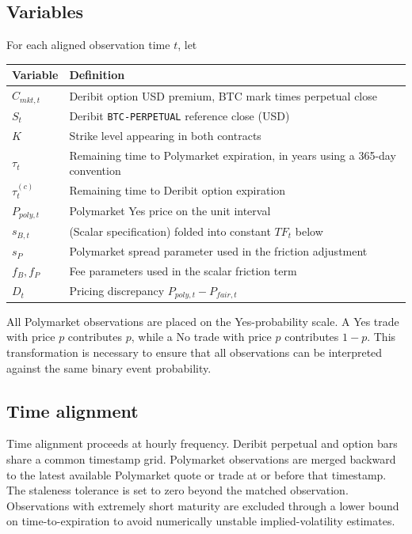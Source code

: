 \documentclass[11pt]{article}
\numberwithin{equation}{section}
\theoremstyle{plain}
\begin{document}
\subsection{Variables}
For each aligned observation time $t$, let
\begin{center}
\begin{tabular}{ll}
\toprule
Variable & Definition \\
\midrule
$C_{mkt,t}$ & Deribit option USD premium, BTC mark times perpetual close \\
$S_t$ & Deribit \texttt{BTC-PERPETUAL} reference close (USD) \\
$K$ & Strike level appearing in both contracts \\
$\tau_t$ & Remaining time to Polymarket expiration, in years using a 365-day convention \\
$\tau_t^{(c)}$ & Remaining time to Deribit option expiration \\
$P_{poly,t}$ & Polymarket Yes price on the unit interval \\
$s_{B,t}$ & (Scalar specification) folded into constant $TF_t$ below \\
$s_P$ & Polymarket spread parameter used in the friction adjustment \\
$f_B,f_P$ & Fee parameters used in the scalar friction term \\
$D_t$ & Pricing discrepancy $P_{poly,t}-P_{fair,t}$ \\
\bottomrule
\end{tabular}
\end{center}

All Polymarket observations are placed on the Yes-probability scale. A Yes trade with price $p$ contributes $p$, while a No trade with price $p$ contributes $1-p$. This transformation is necessary to ensure that all observations can be interpreted against the same binary event probability.

\subsection{Time alignment}
Time alignment proceeds at hourly frequency. Deribit perpetual and option bars share a common timestamp grid. Polymarket observations are merged backward to the latest available Polymarket quote or trade at or before that timestamp. The staleness tolerance is set to zero beyond the matched observation. Observations with extremely short maturity are excluded through a lower bound on time-to-expiration to avoid numerically unstable implied-volatility estimates.
\end{document}
